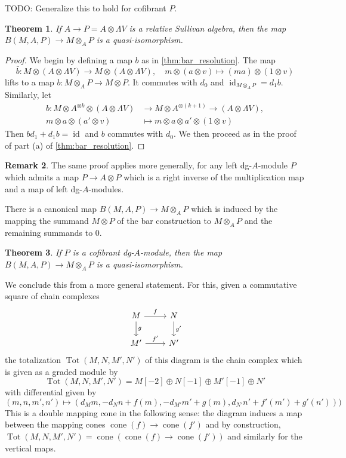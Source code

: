 \documentclass{scrartcl}
\theoremstyle{plain}
\newtheorem{theorem}{Theorem}[section]
\theoremstyle{definition}
\newtheorem{remark}[theorem]{Remark}
\DeclareMathOperator{\Tot}{Tot}
\DeclareMathOperator{\cone}{cone}
\DeclareMathOperator{\id}{id}
\begin{document}
TODO: Generalize this to hold for cofibrant $P$. 
\begin{theorem}\label{thm:bar-resolution-sullivan}
    If $A\to P = A\otimes \Lambda V$ is a relative Sullivan algebra, then the map $B(M, A, P) \to M\otimes_A P$ is a quasi-isomorphism.
\end{theorem}
\begin{proof}
    We begin by defining a map $b$ as in \ref{thm:bar_resolution}. The map $$\bar b \colon M\otimes (A\otimes \Lambda V) \to M\otimes (A\otimes \Lambda V),\quad m\otimes (a\otimes v)\mapsto (ma)\otimes (1\otimes v)$$ lifts to a map $b\colon M\otimes_A P\to M\otimes P$. It commutes with $d_0$ and $\id_{M\otimes_A P} = d_1 b$. Similarly, let 
    \begin{align*}
        b\colon M\otimes A^{\otimes k} \otimes (A\otimes \Lambda V)&\to M\otimes A^{\otimes (k+1)} \to (A\otimes \Lambda V), \\
        m\otimes a \otimes (a'\otimes v) &\mapsto m\otimes a \otimes a' \otimes (1\otimes v)
    \end{align*}
    Then $b d_1 + d_1 b = \id$ and $b$ commutes with $d_0$. We then proceed as in the proof of part (a) of \ref{thm:bar_resolution}. 
\end{proof}
\begin{remark}
    The same proof applies more generally, for any left dg-$A$-module $P$ which admits a map $P\to A\otimes P$ which is a right inverse of the multiplication map and a map of left dg-$A$-modules.
\end{remark}

There is a canonical map $B(M, A, P)\to M\otimes_A P$ which is induced by the mapping the summand $M\otimes P$ of the bar construction to $M\otimes_A P$ and the remaining summands to $0$. 
\begin{theorem}\label{thm:bar-resolution-sullivan-1}
    If $P$ is a cofibrant dg-$A$-module, then the map $B(M, A, P)\to M\otimes_A P$ is a quasi-isomorphism. 
\end{theorem}
We conclude this from a more general statement. For this, given a commutative square of chain complexes
\[
    \begin{tikzcd}
        M \dar["g"] \rar["f"] & N\dar["g'"] \\
        M' \rar["f'"] & N'
    \end{tikzcd}
\]
the totalization $\Tot(M, N, M', N')$ of this diagram is the chain complex which is given as a graded module by 
$$\Tot(M, N, M', N') = M[-2]\oplus N[-1]\oplus M'[-1]\oplus N'$$ with differential given by 
$$(m, n, m', n') \mapsto (d_M m, -d_N n + f(m), -d_{M'} m' + g(m), d_{N'} n' + f'(m') + g'(n')))$$
This is a double mapping cone in the following sense: the diagram induces a map between the mapping cones $\cone(f)\to \cone(f')$ and by construction, $\Tot(M, N, M', N') = \cone(\cone(f)\to \cone(f'))$ and similarly for the vertical maps. 
\end{document}
